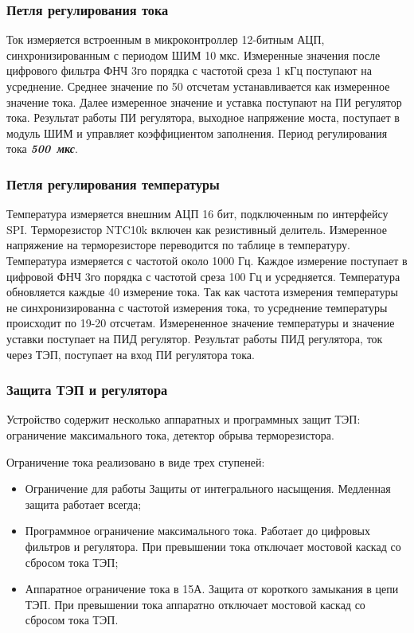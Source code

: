 \subsubsection{Петля регулирования тока}

Ток измеряется встроенным в микроконтроллер 12-битным АЦП, синхронизированным с периодом ШИМ 10 мкс.
Измеренные значения после цифрового фильтра ФНЧ 3го порядка с частотой среза 1 кГц поступают на усреднение.
Среднее значение по 50 отсчетам устанавливается как измеренное значение тока.
Далее измеренное значение и уставка поступают на ПИ регулятор тока. Результат работы ПИ регулятора,
выходное напряжение моста, поступает в модуль ШИМ и управляет коэффициентом заполнения.
Период регулирования тока \textit{\textbf{500~мкс}}.


\subsubsection{Петля регулирования температуры}

Температура измеряется внешним АЦП 16 бит, подключенным по интерфейсу SPI.
Терморезистор NTC10k включен как резистивный делитель. Измеренное напряжение на терморезисторе
переводится по таблице в температуру. Температура измеряется с частотой около 1000 Гц.
Каждое измерение поступает в цифровой ФНЧ 3го порядка с частотой среза 100 Гц и усредняется.
Температура обновляется каждые 40 измерение тока. Так как частота измерения температуры
не синхронизированна с частотой измерения тока, то усреднение температуры происходит по 19-20 отсчетам.
Измерененное значение температуры и значение уставки поступает на ПИД регулятор.
Результат работы ПИД регулятора, ток через ТЭП, поступает на вход ПИ регулятора тока.


\subsubsection{Защита ТЭП и регулятора}

Устройство содержит несколько аппаратных и программных защит ТЭП: ограничение максимального тока,
детектор обрыва терморезистора.

Ограничение тока реализовано в виде трех ступеней:
\begin{itemize}
    \item Ограничение для работы Защиты от интегрального насыщения. Медленная защита работает всегда;
    \item Программное ограничение максимального тока. Работает до цифровых фильтров и регулятора.
          При превышении тока отключает мостовой каскад со сбросом тока ТЭП;
    \item Аппаратное ограничение тока в 15А. Защита от короткого замыкания в цепи ТЭП.
          При превышении тока аппаратно отключает мостовой каскад со сбросом тока ТЭП.
\end{itemize}

